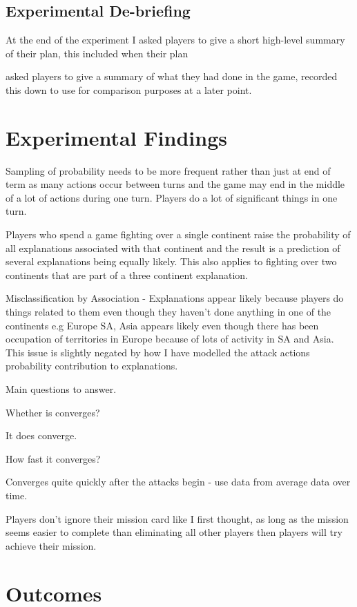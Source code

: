 \documentclass[parskip]{cs4rep}
\begin{document}
\subsection{Experimental De-briefing}

At the end of the experiment I asked players to give a short high-level summary of their plan, this included when their plan

asked players to give a summary of what they had done in the game, recorded this down to use for comparison purposes at a later point.

\section{Experimental Findings}

Sampling of probability needs to be more frequent rather than just at end of term as many actions occur between turns and the game may end in the middle of a lot of actions during one turn. Players do a lot of significant things in one turn.

Players who spend a game fighting over a single continent raise the probability of all explanations associated with that continent and the result is a prediction of several explanations being equally likely. This also applies to fighting over two continents that are part of a three continent explanation.

Misclassification by Association - Explanations appear likely because players do things related to them even though they haven't done anything in one of the continents e.g Europe SA, Asia appears likely even though there has been occupation of territories in Europe because of lots of activity in SA and Asia. This issue is slightly negated by how I have modelled the attack actions probability contribution to explanations.

Main questions to answer.

Whether is converges?

It does converge.

How fast it converges?

Converges quite quickly after the attacks begin - use data from average data over time.

Players don't ignore their mission card like I first thought, as long as the mission seems easier to complete than eliminating all other players then players will try achieve their mission.

\section{Outcomes}
\end{document}
